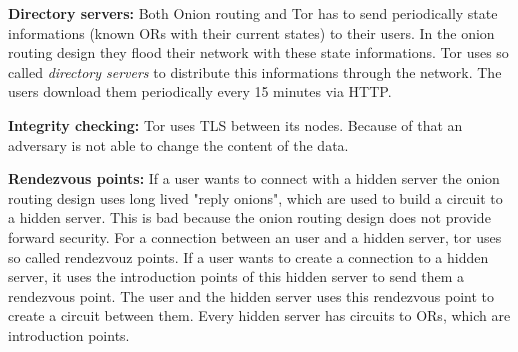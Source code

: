 \textbf{Directory servers:} Both Onion routing and Tor has to send periodically state informations (known ORs with their current states) to their users. In the onion routing design they flood their network with these state informations. Tor uses so called \textit{directory servers} to distribute this informations through the network. The users download them periodically every 15 minutes via HTTP.

\textbf{Integrity checking:} Tor uses TLS between its nodes. Because of that an adversary is not able to change the content of the data.

\textbf{Rendezvous points:} If a user wants to connect with a hidden server the onion routing design uses long lived "reply onions", which are used to build a circuit to a hidden server. This is bad because the onion routing design does not provide forward security. For a connection between an user and a hidden server, tor uses so called rendezvouz points. If a user wants to create a connection to a hidden server, it uses the introduction points of this hidden server to send them a rendezvous point. The user and the hidden server uses this rendezvous point to create a circuit between them. Every hidden server has circuits to ORs, which are introduction points.\cite{rendezvousPoints}